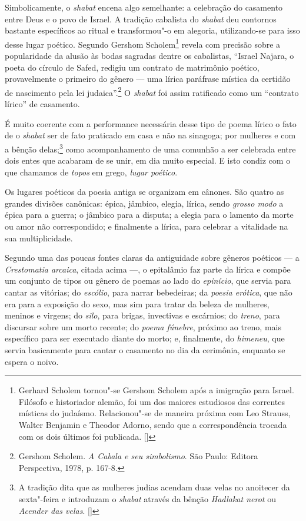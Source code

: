 Simbolicamente, o \emph{shabat} encena algo semelhante: a celebração do
casamento entre Deus e o povo de Israel. A tradição cabalista do \emph{shabat}
deu contornos bastante específicos ao ritual e transformou"-o em
alegoria, utilizando-se para isso desse lugar poético. Segundo Gershom
Scholem\footnote{Gerhard Scholem tornou"-se Gershom Scholem após a imigração para Israel. Filósofo e historiador alemão, foi um dos maiores estudiosos das correntes místicas do judaísmo. Relacionou"-se de maneira próxima com Leo Strauss, Walter Benjamin e Theodor Adorno, sendo que a correspondência trocada com os dois últimos foi publicada. []} revela com precisão sobre a popularidade da alusão às bodas
sagradas dentre os cabalistas, ``Israel Najara, o poeta do círculo de
Safed, redigiu um contrato de matrimônio poético, provavelmente o
primeiro do gênero --- uma lírica paráfrase mística da certidão de
nascimento pela lei judaica''.\footnote{Gershom Scholem. \emph{A Cabala e seu simbolismo}. São Paulo: Editora Perspectiva, 1978, p. 167-8.} O \emph{shabat} foi assim
ratificado como um ``contrato lírico'' de casamento.

É muito coerente com a performance necessária desse tipo de poema lírico
o fato de o \emph{shabat} ser de fato praticado em casa e não na sinagoga; por
mulheres e com a bênção delas;\footnote{A tradição dita que as mulheres judias acendam duas velas no anoitecer da sexta"-feira e introduzam o \emph{shabat} através da bênção \emph{Hadlakat nerot} ou \emph{Acender das velas}. []} como acompanhamento de uma comunhão a ser celebrada entre dois entes que acabaram de se unir, em dia muito
especial. E isto condiz com o que chamamos de \emph{topos} em grego,
\emph{lugar poético}.

Os lugares poéticos da poesia antiga se organizam em cânones. São quatro
as grandes divisões canônicas: épica, jâmbico, elegia, lírica, sendo
\emph{grosso modo} a épica para a guerra; o jâmbico para a disputa; a
elegia para o lamento da morte ou amor não correspondido; e finalmente a
lírica, para celebrar a vitalidade na sua multiplicidade.

Segundo uma das poucas fontes claras da antiguidade sobre gêneros
poéticos --- a \emph{Crestomatia arcaica}, citada acima ---, o
epitalâmio faz parte da lírica e compõe um conjunto de tipos ou gênero
de poemas ao lado do \emph{epinício}, que servia para cantar as
vitórias; do \emph{escólio}, para narrar bebedeiras; da \emph{poesia
erótica}, que não era para a exposição do sexo, mas sim para tratar da
beleza de mulheres, meninos e virgens; do \emph{silo}, para brigas,
invectivas e escárnios; do \emph{treno}, para discursar sobre um morto
recente; do \emph{poema fúnebre}, próximo ao treno, mais específico para
ser executado diante do morto; e, finalmente, do \emph{himeneu}, que
servia basicamente para cantar o casamento no dia da cerimônia,
enquanto se espera o noivo.

